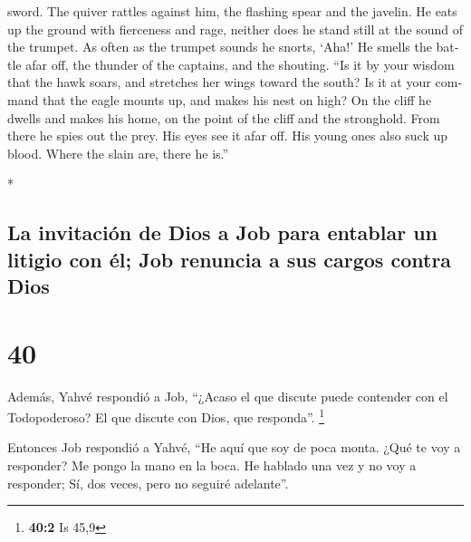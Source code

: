 \begin{paracol}{2}
\begin{otherlanguage}{english}
sword.  The quiver rattles against him, the flashing
spear and the javelin.  He eats up the ground with
fierceness and rage, neither does he stand still at the sound of the
trumpet.  As often as the trumpet sounds he snorts,
`Aha!' He smells the battle afar off, the thunder of the captains, and
the shouting.  ``Is it by your wisdom that the hawk
soars, and stretches her wings toward the south?  Is it
at your command that the eagle mounts up, and makes his nest on high?
 On the cliff he dwells and makes his home, on the point
of the cliff and the stronghold.  From there he spies out
the prey. His eyes see it afar off.  His young ones also
suck up blood. Where the slain are, there he is.''

\end{otherlanguage}

\switchcolumn[0]*

\hypertarget{la-invitaciuxf3n-de-dios-a-job-para-entablar-un-litigio-con-uxe9l-job-renuncia-a-sus-cargos-contra-dios}{%
\subsection{La invitación de Dios a Job para entablar un litigio con él;
Job renuncia a sus cargos contra
Dios}\label{la-invitaciuxf3n-de-dios-a-job-para-entablar-un-litigio-con-uxe9l-job-renuncia-a-sus-cargos-contra-dios}}

\hypertarget{section-78}{%
\section{40}\label{section-78}}

 Además, Yahvé respondió a Job,  ``¿Acaso el
que discute puede contender con el Todopoderoso? El que discute con
Dios, que responda''. \footnote{\textbf{40:2} Is 45,9}

 Entonces Job respondió a Yahvé,  ``He aquí
que soy de poca monta. ¿Qué te voy a responder? Me pongo la mano en la
boca.  He hablado una vez y no voy a responder; Sí, dos
veces, pero no seguiré adelante''.


\end{paracol}
